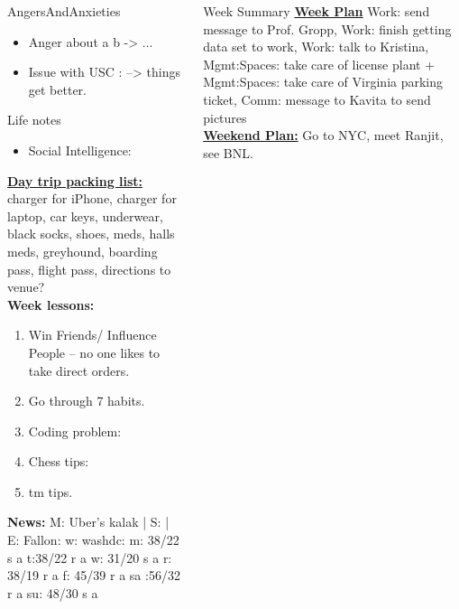 \begin{frame}
\begin{columns}
\begin{column}{0.25\linewidth}
\begin{block}{AngersAndAnxieties}
\begin{itemize}
        \item \tiny Anger about a b  -> ...
        \item \tiny Issue with USC : --> things get better. 
        \end{itemize}
      \end{block}
      \begin{block}{Life notes}
        \begin{itemize}
          \tiny \item \tiny Social Intelligence: 
        \end{itemize}
      \end{block}

      \begin{block}
      
      {\underline{\bf Day trip packing list:} charger for iPhone,
        charger for laptop, car keys, underwear, black socks, shoes,
        meds, halls meds, greyhound, boarding pass, flight pass, directions to
        venue?} \\ 
      {\tiny {\bf Week lessons:}} \\ 
      \begin{enumerate}
        \tiny \item \tiny Win Friends/ Influence People – no one
        likes to take direct orders.
      \item \tiny Go through 7 habits.
      \item \tiny Coding problem: 
      \item \tiny Chess tips: 
      \item \tiny tm tips.
      \end{enumerate}
          {{\tiny {\bf News:}} M: Uber's kalak  | S:    | E: Fallon: 
            w: washdc: 
            {m: {38/22 s a}}  
            {t:{38/22 r a}} 
            {w: {31/20 s a}} 
            {r: {38/19 r a}} 
            {f: {45/39 r a}} 
            {sa :{56/32 r a} }
            {su: {48/30 s a  }}}
    \end{block}
    
  \end{column}     
  
  \begin{column}{0.5\linewidth}
    \begin{block}{Week Summary} 
      {\underline{\bf Week Plan}  Work: send message to Prof. Gropp, Work: finish getting data set to work,
        Work: talk to Kristina, Mgmt:Spaces: take care of license
        plant + Mgmt:Spaces: take care of Virginia parking ticket,
        Comm: message to Kavita to send pictures}\\ 
      {\underline{\bf Weekend Plan:} Go to NYC, meet Ranjit, see BNL.}\\
    \end{block}
    

\end{column}
\end{columns}
\end{frame}

